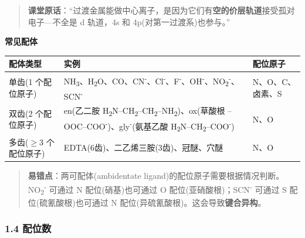 \documentclass[a4paper,11pt]{ctexart}
\newcounter{none}
\newcommand{\箭}{\ensuremath{\rightarrow}}
\newcommand{\左箭}{\ensuremath{\leftarrow}}
\newcommand{\上箭}{\ensuremath{\uparrow}}
\newcommand{\下箭}{\ensuremath{\downarrow}}
\newcommand{\衡}{\ensuremath{\rightleftharpoons}}
\newcommand{\双箭}{\ensuremath{\leftrightarrow}}
\newcommand{\约等于}{\ensuremath{\approx}}
\newcommand{\小于等于}{\ensuremath{\leq}}
\newcommand{\大于等于}{\ensuremath{\geq}}
\newcommand{\不等于}{\ensuremath{\neq}}
\newcommand{\西格马}{\ensuremath{\sigma}}
\newcommand{\派}{\ensuremath{\pi}}
\begin{document}
\begin{quote}
\textbf{课堂原话}：``过渡金属能做中心离子，是因为它们有\textbf{空的价层轨道}接受孤对电子---不全是 d 轨道，4s 和 4p(对第一过渡系)也参与。''
\end{quote}

\textbf{常见配体}

{\def\LTcaptype{none} %
\begin{longtable}[]{@{}
  >{\raggedright\arraybackslash}p{}
  >{\raggedright\arraybackslash}p{}
  >{\centering\arraybackslash}p{}@{}}
\toprule\noalign{}
\begin{minipage}[b]{\linewidth}\raggedright
配体类型
\end{minipage} & \begin{minipage}[b]{\linewidth}\raggedright
实例
\end{minipage} & \begin{minipage}[b]{\linewidth}\centering
配位原子
\end{minipage} \\
\midrule\noalign{}
\endhead
\bottomrule\noalign{}
\endlastfoot
单齿(1 个配位原子) & NH\textsubscript{3}、H\textsubscript{2}O、CO、CN\textsuperscript{-}、Cl\textsuperscript{-}、F\textsuperscript{-}、OH\textsuperscript{-}、NO\textsubscript{2}\textsuperscript{-}、SCN\textsuperscript{-} & N、O、C、卤素、S \\
双齿(2 个配位原子) & en(乙二胺 H\textsubscript{2}N--CH\textsubscript{2}--CH\textsubscript{2}--NH\textsubscript{2})、ox(草酸根 --OOC--COO\textsuperscript{-})、gly\textsuperscript{-}(氨基乙酸 H\textsubscript{2}N--CH\textsubscript{2}--COO\textsuperscript{-}) & N、O \\
多齿(\大于等于3 个配位原子) & EDTA(6齿)、二乙烯三胺(3齿)、冠醚、穴醚 & N、O \\
\end{longtable}
}

\begin{quote}
\textbf{易错点}：两可配体(ambidentate ligand)的配位原子需要根据情况判断。NO\textsubscript{2}\textsuperscript{-} 可通过 N 配位(硝基)也可通过 O 配位(亚硝酸根)；SCN\textsuperscript{-} 可通过 S 配位(硫氰酸根)也可通过 N 配位(异硫氰酸根)。这会导致\textbf{键合异构}。
\end{quote}

\subsubsection{1.4 配位数}\label{ux914dux4f4dux6570}
\end{document}
